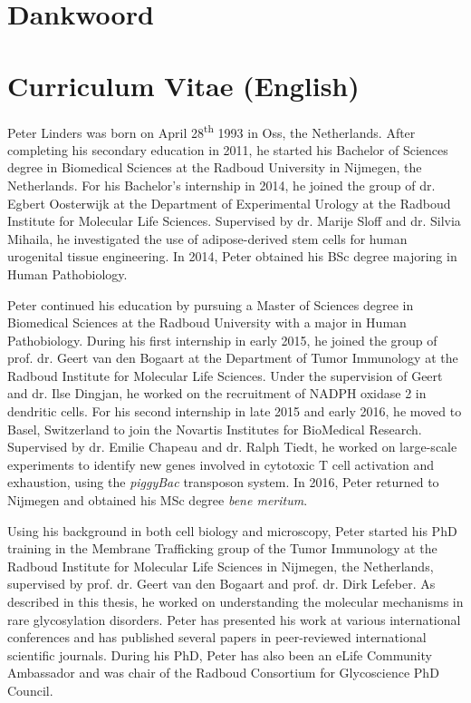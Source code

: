 \cleartoleftpage

\section{Dankwoord}



\cleartoleftpage

\section{Curriculum Vitae (English)}

Peter Linders was born on April 28\textsuperscript{th} 1993 in Oss, the Netherlands. After completing his secondary education in 2011, he started his Bachelor of Sciences degree in Biomedical Sciences at the Radboud University in Nijmegen, the Netherlands. For his Bachelor's internship in 2014, he joined the group of dr. Egbert Oosterwijk at the Department of Experimental Urology at the Radboud Institute for Molecular Life Sciences. Supervised by dr. Marije Sloff and dr. Silvia Mihaila, he investigated the use of adipose-derived stem cells for human urogenital tissue engineering. In 2014, Peter obtained his BSc degree majoring in Human Pathobiology.

Peter continued his education by pursuing a Master of Sciences degree in Biomedical Sciences at the Radboud University with a major in Human Pathobiology. During his first internship in early 2015, he joined the group of prof. dr. Geert van den Bogaart at the Department of Tumor Immunology at the Radboud Institute for Molecular Life Sciences. Under the supervision of Geert and dr. Ilse Dingjan, he worked on the recruitment of NADPH oxidase 2 in dendritic cells. For his second internship in late 2015 and early 2016, he moved to Basel, Switzerland to join the Novartis Institutes for BioMedical Research. Supervised by dr. Emilie Chapeau and dr. Ralph Tiedt, he worked on large-scale experiments to identify new genes involved in cytotoxic T cell activation and exhaustion, using the \emph{piggyBac} transposon system. In 2016, Peter returned to Nijmegen and obtained his MSc degree \emph{bene meritum}.

Using his background in both cell biology and microscopy, Peter started his PhD training in the Membrane Trafficking group of the Tumor Immunology at the Radboud Institute for Molecular Life Sciences in Nijmegen, the Netherlands, supervised by prof. dr. Geert van den Bogaart and prof. dr. Dirk Lefeber. As described in this thesis, he worked on understanding the molecular mechanisms in rare glycosylation disorders. Peter has presented his work at various international conferences and has published several papers in peer-reviewed international scientific journals. During his PhD, Peter has also been an eLife Community Ambassador and was chair of the Radboud Consortium for Glycoscience PhD Council.

